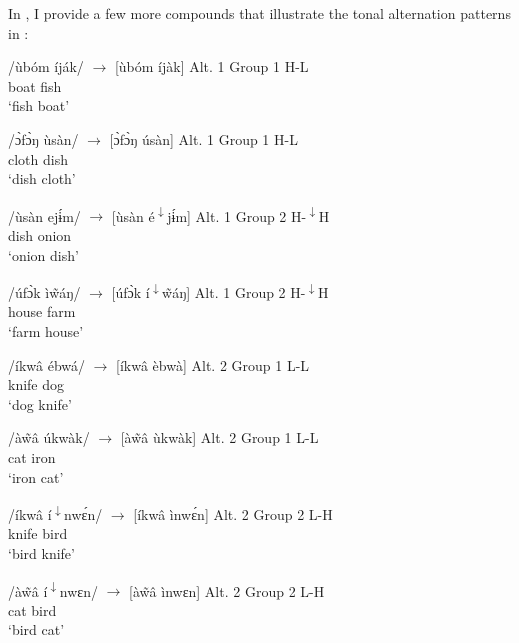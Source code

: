 \documentclass[output=paper]{langscibook}
\begin{document}
In , I provide a few more compounds that illustrate the tonal alternation patterns in : 

\ea\label{ex:glewwe:2} 
\ea \label{ex:glewwe:2a}
\gll /ùbóm íják/  ${\rightarrow}$ [ùbóm íjàk]  Alt. 1 Group 1 H-L\\ 
       boat fish\\
\glt ‘fish boat’ 

\ex\label{ex:glewwe:2b}
\gll   /ɔ̀fɔ̀ŋ ùsàn/  ${\rightarrow}$ [ɔ̀fɔ̀ŋ úsàn]  Alt. 1 Group 1 H-L\\
       cloth dish\\
\glt ‘dish cloth’ 

\ex\label{ex:glewwe:2c}
\gll   /ùsàn ejɨ́m/  ${\rightarrow}$ [ùsàn é\textsuperscript{$\downarrow$}jɨ́m]  Alt. 1 Group 2 H-\textsuperscript{$\downarrow$}H\\
       dish onion\\
\glt   ‘onion dish’ 

\ex\label{ex:glewwe:2d}
\gll   /úfɔ̀k ì\~{w}áŋ/  ${\rightarrow}$ [úfɔ̀k í\textsuperscript{$\downarrow$}\~{w}áŋ]  Alt. 1 Group 2 H-\textsuperscript{$\downarrow$}H\\
       house farm\\
\glt   ‘farm house’

\ex\label{ex:glewwe:2e}
\gll   /íkwâ ébwá/ ${\rightarrow}$ [íkwâ èbwà]  Alt. 2 Group 1 L-L\\
       knife dog\\
\glt   ‘dog knife’

\ex\label{ex:glewwe:2f}
\gll   /à\~{w}â úkwàk/ ${\rightarrow}$ [à\~{w}â ùkwàk]  Alt. 2 Group 1 L-L\\
       cat iron\\
\glt   ‘iron cat’

\ex\label{ex:glewwe:2g}
\gll   /íkwâ í\textsuperscript{$\downarrow$}nwɛ́n/ ${\rightarrow}$ [íkwâ ìnwɛ́n]  Alt. 2 Group 2 L-H\\
       knife bird\\
\glt   ‘bird knife’

\ex\label{ex:glewwe:2h}
\gll   /à\~{w}â í\textsuperscript{$\downarrow$}nwɛn/ ${\rightarrow}$ [à\~{w}â ìnwɛn]  Alt. 2 Group 2 L-H\\
       cat bird\\
\glt   ‘bird cat’
\z
\z
\end{document}

